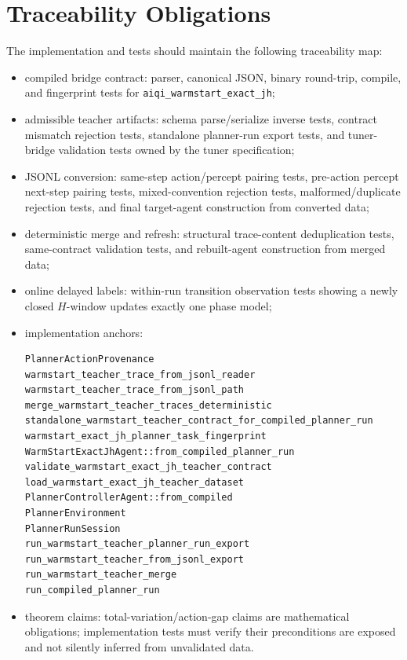 \documentclass[11pt]{article}
\begin{document}
\section{Traceability Obligations}
\label{sec:traceability}

The implementation and tests should maintain the following traceability map:
\begin{itemize}
    \item compiled bridge contract: parser, canonical JSON, binary round-trip,
    compile, and fingerprint tests for \texttt{aiqi\_warmstart\_exact\_jh};
    \item admissible teacher artifacts: schema parse/serialize inverse tests,
    contract mismatch rejection tests, standalone planner-run export tests, and
    tuner-bridge validation tests owned by the tuner specification;
    \item JSONL conversion: same-step action/percept pairing tests,
    pre-action percept next-step pairing tests, mixed-convention rejection
    tests, malformed/duplicate rejection tests, and final target-agent
    construction from converted data;
    \item deterministic merge and refresh: structural trace-content deduplication
    tests, same-contract validation tests, and rebuilt-agent construction from
    merged data;
    \item online delayed labels: within-run transition observation tests showing
    a newly closed \(H\)-window updates exactly one phase model;
    \item implementation anchors:
\begin{verbatim}
PlannerActionProvenance
warmstart_teacher_trace_from_jsonl_reader
warmstart_teacher_trace_from_jsonl_path
merge_warmstart_teacher_traces_deterministic
standalone_warmstart_teacher_contract_for_compiled_planner_run
warmstart_exact_jh_planner_task_fingerprint
WarmStartExactJhAgent::from_compiled_planner_run
validate_warmstart_exact_jh_teacher_contract
load_warmstart_exact_jh_teacher_dataset
PlannerControllerAgent::from_compiled
PlannerEnvironment
PlannerRunSession
run_warmstart_teacher_planner_run_export
run_warmstart_teacher_from_jsonl_export
run_warmstart_teacher_merge
run_compiled_planner_run
\end{verbatim}
    \item theorem claims: total-variation/action-gap claims are mathematical
    obligations; implementation tests must verify their preconditions are
    exposed and not silently inferred from unvalidated data.
\end{itemize}
\end{document}
